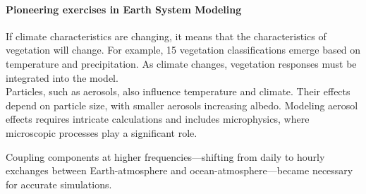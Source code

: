 \paragraph{Pioneering exercises in Earth System Modeling} If climate characteristics are changing, it means that the characteristics of vegetation will change. For example, 15 vegetation classifications emerge based on temperature and precipitation. As climate changes, vegetation responses must be integrated into the model. \\

Particles, such as aerosols, also influence temperature and climate. Their effects depend on particle size, with smaller aerosols increasing albedo. Modeling aerosol effects requires intricate calculations and includes microphysics, where microscopic processes play a significant role.

Coupling components at higher frequencies—shifting from daily to hourly exchanges between Earth-atmosphere and ocean-atmosphere—became necessary for accurate simulations. 

